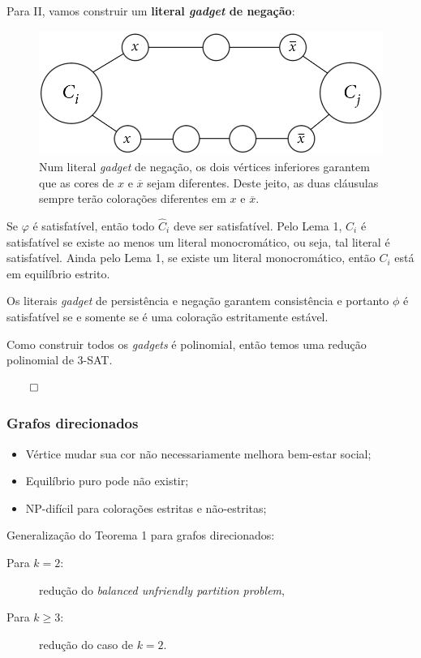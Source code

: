 \documentclass{beamer}
\newcommand{\ov}{\overline}
\theoremstyle{plain}
\newcommand{\gadget}{\textit{gadget}}
\newcommand{\bcolor}[1]{{\color{blue} #1}}
\begin{document}
\begin{frame}
  Para \bcolor{II}, vamos construir um \textbf{literal \gadget{} de negação}:

  \begin{figure}[h]
    \centering\includegraphics[scale=0.3]{imgs/negation.png}
    \captionsetup{justification=raggedright}
    \caption{Num literal \gadget{} de negação, os dois vértices inferiores garantem que as cores
    de $x$ e $\ov{x}$ sejam diferentes. Deste jeito, as duas cláusulas sempre terão colorações
    diferentes em $x$ e $\ov{x}$.}
  \end{figure}
\end{frame}

\begin{frame}

  {\color{blue}{5.}}

  Se $\varphi$ é satisfatível, então todo $\hat{C}_i$ deve ser satisfatível. Pelo Lema 1, $C_i$ é
  satisfatível se existe ao menos um literal monocromático, ou seja, tal literal é satisfatível.
  Ainda pelo Lema 1, se existe um literal monocromático, então $C_i$ está em equilíbrio estrito.

  Os literais \gadget{} de persistência e negação garantem consistência e portanto $\phi$ é
  satisfatível se e somente se é uma coloração estritamente estável.

  Como construir todos os \textit{gadgets} é polinomial, então temos uma redução polinomial de
  3-SAT\@.

  \hfill{}$\qed$
\end{frame}

\begin{frame}
  \frametitle{Grafos direcionados}

  \begin{itemize}
    \item Vértice mudar sua cor não necessariamente melhora bem-estar social;
    \item Equilíbrio puro pode não existir;
    \item NP-difícil para colorações estritas e não-estritas;
  \end{itemize}

  {\color{blue}Generalização do Teorema 1 para grafos direcionados:}

  \begin{description}
    \item[Para $k=2$:] redução do \textit{balanced unfriendly partition problem},
    \item[Para $k\geq 3$:] redução do caso de $k=2$.
  \end{description}
\end{frame}
\end{document}
